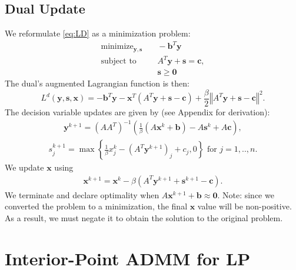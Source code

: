 \documentclass{article}
\begin{document}
\subsection*{Dual Update}
We reformulate \eqref{eq:LD} as a minimization problem:
\begin{align}
\text{minimize}_{\mathbf{y}, \mathbf{s}} &\quad -\mathbf{b}^T\mathbf{y}  \tag{LDR}\label{eq:LDR} \\
\text{subject to } &\quad  A^T \mathbf{y}  + \mathbf{s} = \mathbf{c},  \nonumber \\
&\quad \mathbf{s} \geq \mathbf{0} \nonumber
\end{align}
The dual's augmented Lagrangian function is then:
\[
L^{d}(\mathbf{y},\mathbf{s},\mathbf{x})=-\mathbf{b}^{T}\mathbf{y}-\mathbf{x}^{T}\left(A^{T}\mathbf{y}+\mathbf{s}-\mathbf{c}\right)+\frac{\beta}{2}\left\Vert A^{T}\mathbf{y}+\mathbf{s}-\mathbf{c}\right\Vert ^{2}.
\]
The decision variable updates are given by (see Appendix for derivation):
\begin{align}\label{eq:y_dual_update}
\mathbf{y}^{k+1} = \left(AA^{T}\right)^{-1}\left(\frac{1}{\beta}\left(A\mathbf{x}^{k}+\mathbf{b}\right)-A\mathbf{s}^{k}+A\mathbf{c}\right),
\end{align}
\begin{align}\label{eq:s_dual_update}
s_j^{k+1} = \max\left\{ \frac{1}{\beta}{x}_j^k-(A^{T}\mathbf{y}^{k+1})_j+{c}_j,0\right\}  \text{ for $j = 1,..,n$}.
\end{align}
We update $\mathbf{x}$ using
\begin{align}\label{eq:x_dual_update}
\mathbf{x}^{k+1} = \mathbf{x}^k - \beta\left(A^T \mathbf{y}^{k+1} + \mathbf{s}^{k+1} - \mathbf{c}\right).
\end{align}
We terminate and declare optimality when $A \mathbf{x}^{k+1} + \mathbf{b} \approx \mathbf{0}$. Note: since we converted the problem to a minimization, the final $\mathbf{x}$ value will be non-positive. As a result, we must negate it to obtain the solution to the original problem.

\section{Interior-Point ADMM for LP}
\end{document}
